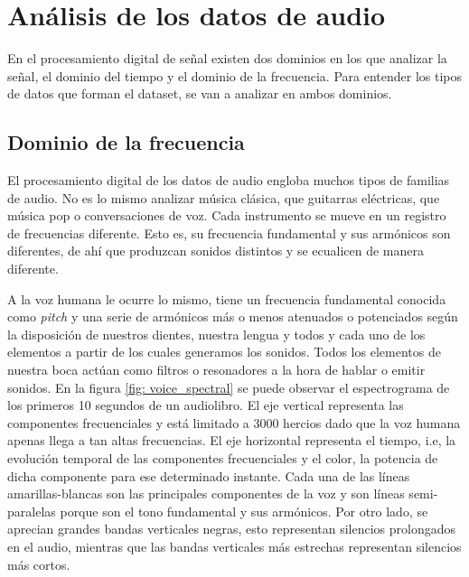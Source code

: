 \section{Análisis de los datos de audio}
En el procesamiento digital de señal existen dos dominios en los que analizar la señal, el dominio del tiempo y el dominio de la frecuencia. Para entender los tipos de datos que forman el dataset, se van a analizar en ambos dominios.

\subsection{Dominio de la frecuencia}
El procesamiento digital de los datos de audio engloba muchos tipos de familias de audio. No es lo mismo analizar música clásica, que guitarras eléctricas, que música pop o conversaciones de voz. Cada instrumento se mueve en un registro de frecuencias diferente. Esto es, su frecuencia fundamental y sus armónicos son diferentes, de ahí que produzcan sonidos distintos y se ecualicen de manera diferente.

A la voz humana le ocurre lo mismo, tiene un frecuencia fundamental conocida como \textit{pitch} y una serie de armónicos más o menos atenuados o potenciados según la disposición de nuestros dientes, nuestra lengua y todos y cada uno de los elementos a partir de los cuales generamos los sonidos. Todos los elementos de nuestra boca actúan como filtros o resonadores a la hora de hablar o emitir sonidos. En la figura \ref{fig: voice_spectral} se puede observar el espectrograma de los primeros 10 segundos de un audiolibro. El eje vertical representa las componentes frecuenciales y está limitado a 3000 hercios dado que la voz humana apenas llega a tan altas frecuencias. El eje horizontal representa el tiempo, i.e, la evolución temporal de las componentes frecuenciales y el color, la potencia de dicha componente para ese determinado instante. Cada una de las líneas amarillas-blancas son las principales componentes de la voz y son líneas semi-paralelas porque son el tono fundamental y sus armónicos. Por otro lado, se aprecian grandes bandas verticales negras, esto representan silencios prolongados en el audio, mientras que las bandas verticales más estrechas representan silencios más cortos.

